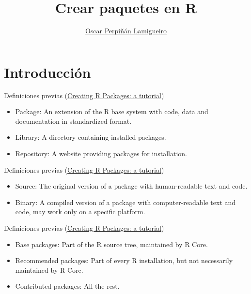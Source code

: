 \documentclass[xcolor={usenames,svgnames,dvipsnames}]{beamer}
\author{\href{https://oscarperpinan.github.io}{Oscar Perpiñán Lamigueiro}}
\date{}
\title{Crear paquetes en R}
\institute[UPM]{Universidad Politécnica de Madrid}
\begin{document}
\maketitle


\section{Introducción}
\label{sec:orgd215a1b}

\begin{frame}[label={sec:org39e6d19}]{Definiciones previas (\href{http://cran.r-project.org/doc/contrib/Leisch-CreatingPackages.pdf}{Creating R Packages: a tutorial})}
\begin{itemize}
\item \alert{Package}: An extension of the R base system with code, data and
documentation in standardized format.
\item \alert{Library}: A directory containing installed packages.
\item \alert{Repository}: A website providing packages for installation.
\end{itemize}
\end{frame}

\begin{frame}[label={sec:org9bd06b5}]{Definiciones previas (\href{http://cran.r-project.org/doc/contrib/Leisch-CreatingPackages.pdf}{Creating R Packages: a tutorial})}
\begin{itemize}
\item \alert{Source}: The original version of a package with human-readable text and code.
\item \alert{Binary}: A compiled version of a package with computer-readable
text and code, may work only on a specific platform.
\end{itemize}
\end{frame}

\begin{frame}[label={sec:orge711bb5}]{Definiciones previas (\href{http://cran.r-project.org/doc/contrib/Leisch-CreatingPackages.pdf}{Creating R Packages: a tutorial})}
\begin{itemize}
\item \alert{Base packages}: Part of the R source tree, maintained by R Core.
\item \alert{Recommended packages}: Part of every R installation, but not
necessarily maintained by R Core.
\item \alert{Contributed packages}: All the rest.
\end{itemize}
\end{frame}
\end{document}
